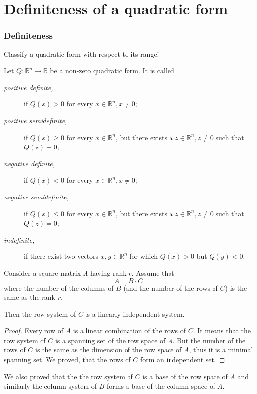 \section{Definiteness of a quadratic form}
\begin{frame}
    \frametitle{Definiteness}
    Classify a quadratic form with respect to its range!
    \begin{definition}
        Let $Q:\mathbb{R}^n\to\mathbb{R}$ be a non-zero quadratic form. It is called
        \begin{description}
            \item[\emph{positive definite,}] if $Q\left( x \right)>0$ for every $x\in\mathbb{R}^n,x\neq 0$;
        \item[\emph{positive semidefinite,}] if $ Q\left( x \right)\geq 0$ for every $x\in\mathbb{R}^n$,
                but there exists a $z\in\mathbb{R}^n, z\neq 0$ such that $Q\left( z \right)=0$;
            \item[\emph{negative definite,}] if $ Q\left( x \right)<0$ for every $x\in\mathbb{R}^n,x\neq 0;$
            \item[\emph{negative semidefinite,}] if $ Q\left( x \right)\leq 0$ for every $x\in\mathbb{R}^n$,
                but there exists a $z\in\mathbb{R}^n, z\neq 0$ such that $Q\left( z \right)=0$;
            \item[\emph{indefinite,}] if there exist two vectors $x,y\in\mathbb{R}^n$ for which
                $Q\left( x \right)>0$ but $Q\left( y \right)<0$.
        \end{description}
    \end{definition}
\end{frame}
\begin{frame}
    \begin{theorem}
    Consider a square matrix $A$ having rank $r$. 
    Assume that 
    \[A=B\cdot C\] 
    where the number of the columns of $B$ (and the number of the rows of $C$) is the same as the rank $r$.
    
    Then the row system of $C$ is a linearly independent system.
    \end{theorem}
    \begin{proof}
        Every row of $A$ is a linear combination of the rows of $C$.
        It means that the row system of $C$ is a spanning set of the row space of $A$.
        But the number of the rows of $C$ is the same as the dimension of the row space of $A$, 
        thus it is a minimal spanning set.
        We proved, that the rows of $C$ form an independent set.
    \end{proof}
    We also proved that the 
    the row system of $C$ is a base of the row space of $A$ and similarly 
    the column system of $B$ forms a base of the column space of $A$.
\end{frame}

